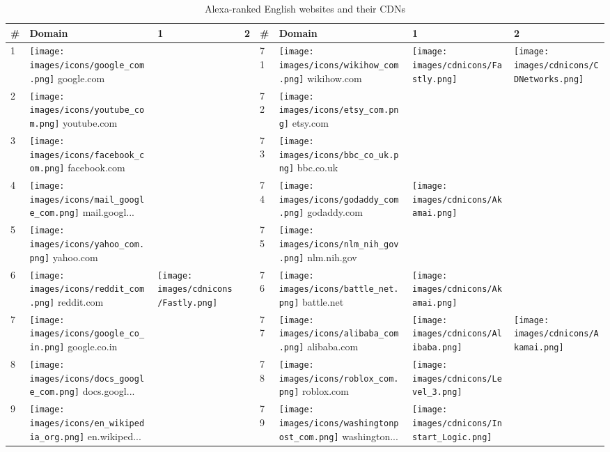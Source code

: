 \begin{table}[tbp]
\centering
\caption{Alexa-ranked English websites and their CDNs}
\label{cdn-table}
\begin{tabular}{|llll|llll|}
\hline
\# & Domain & 1 & 2 & \# & Domain & 1 & 2 \\
\hline
1 & \texttt{[image: images/icons/google\_com.png]} google.com & & & 71 & \texttt{[image: images/icons/wikihow\_com.png]} wikihow.com & \texttt{[image: images/cdnicons/Fastly.png]} & \texttt{[image: images/cdnicons/CDNetworks.png]} \\
2 & \texttt{[image: images/icons/youtube\_com.png]} youtube.com & & & 72 & \texttt{[image: images/icons/etsy\_com.png]} etsy.com & & \\
3 & \texttt{[image: images/icons/facebook\_com.png]} facebook.com & & & 73 & \texttt{[image: images/icons/bbc\_co\_uk.png]} bbc.co.uk & & \\
4 & \texttt{[image: images/icons/mail\_google\_com.png]} mail.googl... & & & 74 & \texttt{[image: images/icons/godaddy\_com.png]} godaddy.com & \texttt{[image: images/cdnicons/Akamai.png]} & \\
5 & \texttt{[image: images/icons/yahoo\_com.png]} yahoo.com & & & 75 & \texttt{[image: images/icons/nlm\_nih\_gov.png]} nlm.nih.gov & & \\
6 & \texttt{[image: images/icons/reddit\_com.png]} reddit.com & \texttt{[image: images/cdnicons/Fastly.png]} & & 76 & \texttt{[image: images/icons/battle\_net.png]} battle.net & \texttt{[image: images/cdnicons/Akamai.png]} & \\
7 & \texttt{[image: images/icons/google\_co\_in.png]} google.co.in & & & 77 & \texttt{[image: images/icons/alibaba\_com.png]} alibaba.com & \texttt{[image: images/cdnicons/Alibaba.png]} & \texttt{[image: images/cdnicons/Akamai.png]} \\
8 & \texttt{[image: images/icons/docs\_google\_com.png]} docs.googl... & & & 78 & \texttt{[image: images/icons/roblox\_com.png]} roblox.com & \texttt{[image: images/cdnicons/Level\_3.png]} & \\
9 & \texttt{[image: images/icons/en\_wikipedia\_org.png]} en.wikiped... & & & 79 & \texttt{[image: images/icons/washingtonpost\_com.png]} washington... & \texttt{[image: images/cdnicons/Instart\_Logic.png]} & \\

\end{tabular}
\end{table}
